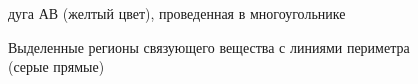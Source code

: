 \documentclass[a4paper, 14pt]{article}
\begin{document}
	
	 \begin{figure}[h]
	\begin{center}
		\begin{minipage}[h]{0.4\linewidth}
			\caption{дуга АВ (желтый цвет), проведенная в многоугольнике}
			\label{arc}
		\end{minipage}
		\hfill
		\begin{minipage}[h]{0.4\linewidth}
			\caption{Выделенные регионы связующего вещества с линиями периметра (серые прямые)}
			\label{fig:find_contour}
			\end{minipage}
		\end{center}
	\end{figure}


	 
\end{document}
